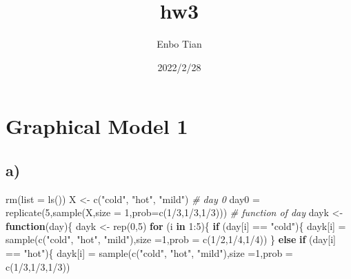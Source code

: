 \documentclass[
]{article}
\title{hw3}
\author{Enbo Tian}
\date{2022/2/28}
\newenvironment{Shaded}{\begin{snugshade}}{\end{snugshade}}
\newcommand{\AttributeTok}[1]{\textcolor[rgb]{0.77,0.63,0.00}{#1}}
\newcommand{\CommentTok}[1]{\textcolor[rgb]{0.56,0.35,0.01}{\textit{#1}}}
\newcommand{\ControlFlowTok}[1]{\textcolor[rgb]{0.13,0.29,0.53}{\textbf{#1}}}
\newcommand{\DecValTok}[1]{\textcolor[rgb]{0.00,0.00,0.81}{#1}}
\newcommand{\FunctionTok}[1]{\textcolor[rgb]{0.00,0.00,0.00}{#1}}
\newcommand{\NormalTok}[1]{#1}
\newcommand{\OtherTok}[1]{\textcolor[rgb]{0.56,0.35,0.01}{#1}}
\newcommand{\SpecialCharTok}[1]{\textcolor[rgb]{0.00,0.00,0.00}{#1}}
\newcommand{\StringTok}[1]{\textcolor[rgb]{0.31,0.60,0.02}{#1}}
\begin{document}
\maketitle

\hypertarget{graphical-model-1}{%
\section{Graphical Model 1}\label{graphical-model-1}}

\hypertarget{a}{%
\subsection{a)}\label{a}}

\begin{Shaded}
\begin{Highlighting}[]
\FunctionTok{rm}\NormalTok{(}\AttributeTok{list =} \FunctionTok{ls}\NormalTok{())}
\NormalTok{X }\OtherTok{\textless{}{-}} \FunctionTok{c}\NormalTok{(}\StringTok{"cold"}\NormalTok{, }\StringTok{"hot"}\NormalTok{, }\StringTok{"mild"}\NormalTok{)}
\CommentTok{\# day 0}
\NormalTok{day0 }\OtherTok{=} \FunctionTok{replicate}\NormalTok{(}\DecValTok{5}\NormalTok{,}\FunctionTok{sample}\NormalTok{(X,}\AttributeTok{size =} \DecValTok{1}\NormalTok{,}\AttributeTok{prob=}\FunctionTok{c}\NormalTok{(}\DecValTok{1}\SpecialCharTok{/}\DecValTok{3}\NormalTok{,}\DecValTok{1}\SpecialCharTok{/}\DecValTok{3}\NormalTok{,}\DecValTok{1}\SpecialCharTok{/}\DecValTok{3}\NormalTok{)))}
\CommentTok{\# function of day}
\NormalTok{dayk }\OtherTok{\textless{}{-}} \ControlFlowTok{function}\NormalTok{(day)\{}
\NormalTok{  dayk }\OtherTok{\textless{}{-}} \FunctionTok{rep}\NormalTok{(}\DecValTok{0}\NormalTok{,}\DecValTok{5}\NormalTok{)}
  \ControlFlowTok{for}\NormalTok{ (i }\ControlFlowTok{in} \DecValTok{1}\SpecialCharTok{:}\DecValTok{5}\NormalTok{)\{}
    \ControlFlowTok{if}\NormalTok{ (day[i] }\SpecialCharTok{==} \StringTok{"cold"}\NormalTok{)\{}
\NormalTok{    dayk[i] }\OtherTok{=} \FunctionTok{sample}\NormalTok{(}\FunctionTok{c}\NormalTok{(}\StringTok{"cold"}\NormalTok{, }\StringTok{"hot"}\NormalTok{, }\StringTok{"mild"}\NormalTok{),}\AttributeTok{size =}\DecValTok{1}\NormalTok{,}\AttributeTok{prob =} \FunctionTok{c}\NormalTok{(}\DecValTok{1}\SpecialCharTok{/}\DecValTok{2}\NormalTok{,}\DecValTok{1}\SpecialCharTok{/}\DecValTok{4}\NormalTok{,}\DecValTok{1}\SpecialCharTok{/}\DecValTok{4}\NormalTok{))}
\NormalTok{    \}}
    \ControlFlowTok{else} \ControlFlowTok{if}\NormalTok{ (day[i] }\SpecialCharTok{==} \StringTok{"hot"}\NormalTok{)\{}
\NormalTok{    dayk[i] }\OtherTok{=} \FunctionTok{sample}\NormalTok{(}\FunctionTok{c}\NormalTok{(}\StringTok{"cold"}\NormalTok{, }\StringTok{"hot"}\NormalTok{, }\StringTok{"mild"}\NormalTok{),}\AttributeTok{size =}\DecValTok{1}\NormalTok{,}\AttributeTok{prob =} \FunctionTok{c}\NormalTok{(}\DecValTok{1}\SpecialCharTok{/}\DecValTok{3}\NormalTok{,}\DecValTok{1}\SpecialCharTok{/}\DecValTok{3}\NormalTok{,}\DecValTok{1}\SpecialCharTok{/}\DecValTok{3}\NormalTok{))}

\end{Highlighting}
\end{Shaded}
\end{document}

